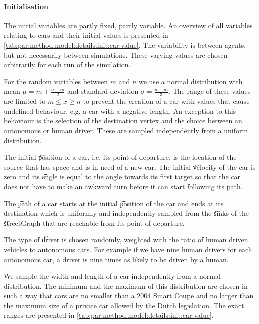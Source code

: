 \paragraph{Initialisation}
\label{par:method:model:details:initialization}
The initial variables are partly fixed, partly variable. An overview of all variables relating to cars and their initial values is presented in \cref{tab:par:method:model:details:init:car:value}. The variability is between agents, but not necessarily between simulations. These varying values are chosen arbitrarily for each run of the simulation.

For the random variables between $m$ and $n$ we use a normal distribution with mean $\mu = m + \frac{n-m}{2}$ and standard deviation $\sigma = \frac{n-m}{3}$. The range of these values are limited to $m \leq x \geq n$ to prevent the creation of a car with values that cause undefined behaviour, e.g. a car with a negative length.
An exception to this behaviour is the selection of the destination vertex and the choice between an autonomous or human driver. These are sampled independently from a uniform distribution.

The initial \t{position} of a car, i.e. its point of departure, is the location of the source that has space and is in need of a new car. The initial \t{velocity} of the car is zero and its \t{angle} is equal to the angle towards its first target so that the car does not have to make an awkward turn before it can start following its path.

The \t{path} of a car starts at the initial \t{position} of the car and ends at its destination which is uniformly and independently sampled from the \t{sinks} of the \t{streetGraph} that are reachable from its point of departure.

The type of \t{driver} is chosen randomly, weighted with the ratio of human driven vehicles to autonomous cars. For example if we have nine human drivers for each autonomous car, a driver is nine times as likely to be driven by a human.

We sample the width and length of a car independently from a normal distribution. The minimum and the maximum of this distribution are chosen in such a way that cars are no smaller than a 2004 Smart Coupe and no larger than the maximum size of a private car allowed by the Dutch legislation. The exact ranges are presented in \cref{tab:par:method:model:details:init:car:value}.

